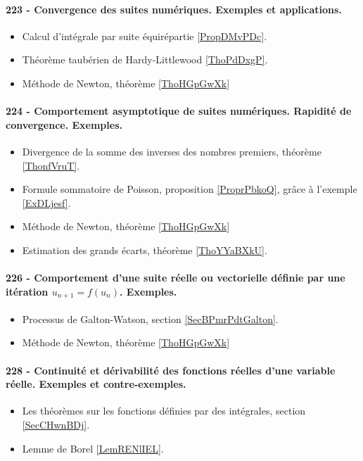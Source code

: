 \paragraph{223 - Convergence des suites numériques. Exemples et applications.}
\begin{itemize}
    \item Calcul d'intégrale par suite équirépartie \ref{PropDMvPDc}.
    \item Théorème taubérien de Hardy-Littlewood \ref{ThoPdDxgP}.
    \item Méthode de Newton, théorème \ref{ThoHGpGwXk}
\end{itemize}
\paragraph{224 - Comportement asymptotique de suites numériques. Rapidité de convergence. Exemples.}
\begin{itemize}
    \item Divergence de la somme des inverses des nombres premiers, théorème \ref{ThonfVruT}.
    \item Formule sommatoire de Poisson, proposition \ref{ProprPbkoQ}, grâce à l'exemple \ref{ExDLjesf}.
    \item Méthode de Newton, théorème \ref{ThoHGpGwXk}
    \item Estimation des grands écarts, théorème \ref{ThoYYaBXkU}.
\end{itemize}
\paragraph{226 - Comportement d’une suite réelle ou vectorielle définie par une itération \( u_{n+1}=f(u_n)\). Exemples.}
\begin{itemize}
    \item Processus de Galton-Watson, section \ref{SecBPmrPdtGalton}.
    \item Méthode de Newton, théorème \ref{ThoHGpGwXk}
\end{itemize}
\paragraph{228 - Continuité et dérivabilité des fonctions réelles d’une variable réelle. Exemples et contre-exemples.}
\begin{itemize}
    \item Les théorèmes sur les fonctions définies par des intégrales, section \ref{SecCHwnBDj}.
    \item Lemme de Borel \ref{LemRENlIEL}.
\end{itemize}
